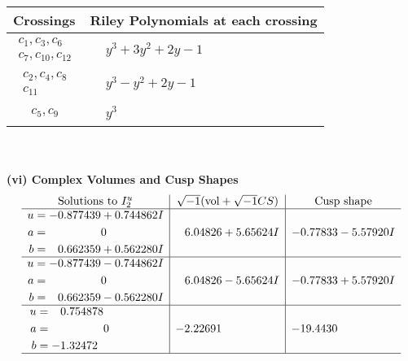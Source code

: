 \documentclass[1p]{elsarticle_modified}
\theoremstyle{definition}
\newcommand{\I}{\sqrt{-1}}
\begin{document}
\begin{tabular}{m{50pt}|m{274pt}}
Crossings & \hspace{64pt}Riley Polynomials at each crossing \\
\hline $$\begin{aligned}c_{1},c_{3},c_{6}\\c_{7},c_{10},c_{12}\end{aligned}$$&$\begin{aligned}
&y^3+3 y^2+2 y-1
\end{aligned}$\\
\hline $$\begin{aligned}c_{2},c_{4},c_{8}\\c_{11}\end{aligned}$$&$\begin{aligned}
&y^3- y^2+2 y-1
\end{aligned}$\\
\hline $$\begin{aligned}c_{5},c_{9}\end{aligned}$$&$\begin{aligned}
&y^3
\end{aligned}$\\
\hline
\end{tabular}\\~\\
\newpage\flushleft \textbf{(vi) Complex Volumes and Cusp Shapes}
$$\begin{array}{c|c|c}  
\text{Solutions to }I^u_{2}& \I (\text{vol} + \sqrt{-1}CS) & \text{Cusp shape}\\
 \hline 
\begin{aligned}
u &= -0.877439 + 0.744862 I \\
a &= \phantom{-0.000000 } 0 \\
b &= \phantom{-}0.662359 + 0.562280 I\end{aligned}
 & \phantom{-}6.04826 + 5.65624 I & -0.77833 - 5.57920 I \\ \hline\begin{aligned}
u &= -0.877439 - 0.744862 I \\
a &= \phantom{-0.000000 } 0 \\
b &= \phantom{-}0.662359 - 0.562280 I\end{aligned}
 & \phantom{-}6.04826 - 5.65624 I & -0.77833 + 5.57920 I \\ \hline\begin{aligned}
u &= \phantom{-}0.754878\phantom{ +0.000000I} \\
a &= \phantom{-0.000000 } 0 \\
b &= -1.32472\phantom{ +0.000000I}\end{aligned}
 & -2.22691\phantom{ +0.000000I} & -19.4430\phantom{ +0.000000I}\\
 \hline 
 \end{array}$$\newpage\newpage\renewcommand{\arraystretch}{1}
\end{document}

